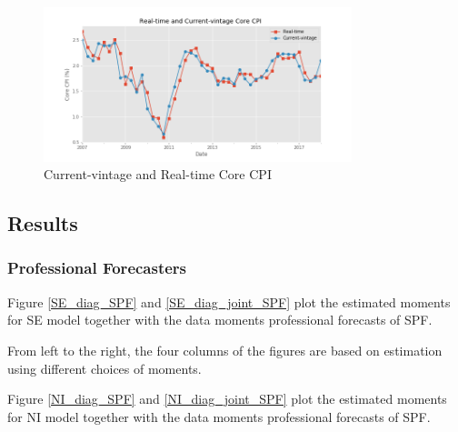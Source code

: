 \documentclass[]{article}
\begin{document}
\begin{figure}[htbp]
	\centering
	\includegraphics[width=0.8\textwidth]{figures/ts_rev_realtime.png}
	\caption{Current-vintage and Real-time Core CPI}
	\label{ts_real_time_current_vintage}
\end{figure}

\subsection{Results}

\subsubsection{Professional Forecasters}

Figure \ref{SE_diag_SPF} and \ref{SE_diag_joint_SPF} plot the estimated moments for SE model together with the data moments professional forecasts of SPF. 

From left to the right, the four columns of the figures are based on estimation using different choices of moments. 

Figure \ref{NI_diag_SPF} and \ref{NI_diag_joint_SPF} plot the estimated moments for NI model together with the data moments professional forecasts of SPF. 
\end{document}
